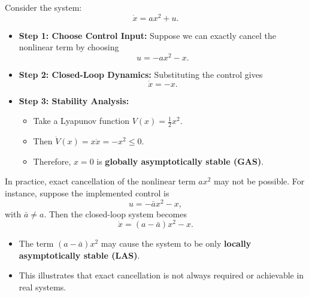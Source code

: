 \begin{example}
Consider the system:
\[
\dot{x} = a x^2 + u.
\]

\begin{itemize}
    \item \textbf{Step 1: Choose Control Input:}  
    Suppose we can exactly cancel the nonlinear term by choosing
    \[
    u = - a x^2 - x.
    \]

    \item \textbf{Step 2: Closed-Loop Dynamics:}  
    Substituting the control gives
    \[
    \dot{x} = -x.
    \]

    \item \textbf{Step 3: Stability Analysis:}  
    \begin{itemize}
        \item Take a Lyapunov function \(V(x) = \frac{1}{2} x^2\).  
        \item Then \(\dot{V}(x) = x \dot{x} = - x^2 \le 0\).  
        \item Therefore, \(x=0\) is \textbf{globally asymptotically stable (GAS)}.
    \end{itemize}
\end{itemize}
\end{example}

\begin{remark}
In practice, exact cancellation of the nonlinear term \(a x^2\) may not be possible. For instance, suppose the implemented control is
\[
u = - \bar{a} x^2 - x,
\]
with \(\bar{a} \neq a\). Then the closed-loop system becomes
\[
\dot{x} = (a - \bar{a}) x^2 - x.
\]

\begin{itemize}
    \item The term \((a-\bar{a}) x^2\) may cause the system to be only \textbf{locally asymptotically stable (LAS)}.  
    \item This illustrates that exact cancellation is not always required or achievable in real systems.
\end{itemize}
\end{remark}


